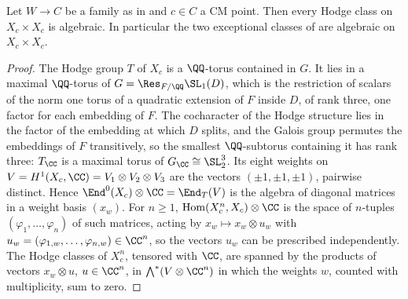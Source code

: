 \begin{theorem}\label{thm:mumfordcm}
Let $W\to C$ be a family as in  and $c\in C$ a CM
point. Then every Hodge class on $X_{c}\times X_{c}$ is algebraic. In
particular the two exceptional classes of  are
algebraic on $X_{c}\times X_{c}$.
\end{theorem}

\begin{proof}
The Hodge group $T$ of $X_{c}$ is a $\QQ$-torus contained in $G$. It lies in a
maximal $\QQ$-torus of $G=\Res_{F/\QQ}\SL_{1}(D)$, which is the restriction of
scalars of the norm one torus of a quadratic extension of $F$ inside $D$, of
rank three, one factor for each embedding of $F$. The cocharacter of the Hodge
structure lies in the factor of the embedding at which $D$ splits, and the
Galois group permutes the embeddings of $F$ transitively, so the smallest
$\QQ$-subtorus containing it has rank three: $T_{\CC}$ is a maximal torus of
$G_{\CC}\cong\SL_{2}^{3}$. Its eight weights on
$V=H^{1}(X_{c},\CC)=V_{1}\otimes V_{2}\otimes V_{3}$ are the vectors
$(\pm1,\pm1,\pm1)$, pairwise distinct. Hence
$\End^{0}(X_{c})\otimes\CC=\End_{T}(V)$ is the algebra of diagonal matrices
in a weight basis $(x_{w})$. For $n\ge1$, $\operatorname{Hom}(X_{c}^{n},X_{c})
\otimes\CC$ is the space of $n$-tuples $(\varphi_{1},\dots,\varphi_{n})$ of
such matrices, acting by $x_{w}\mapsto x_{w}\otimes u_{w}$ with
$u_{w}=(\varphi_{1,w},\dots,\varphi_{n,w})\in\CC^{n}$, so the vectors $u_{w}$
can be prescribed independently. The Hodge classes of $X_{c}^{n}$, tensored
with $\CC$, are spanned by the products of vectors $x_{w}\otimes u$,
$u\in\CC^{n}$, in $\bigwedge^{*}(V\otimes\CC^{n})$ in which the weights $w$,
counted with multiplicity, sum to zero.


\end{proof}
